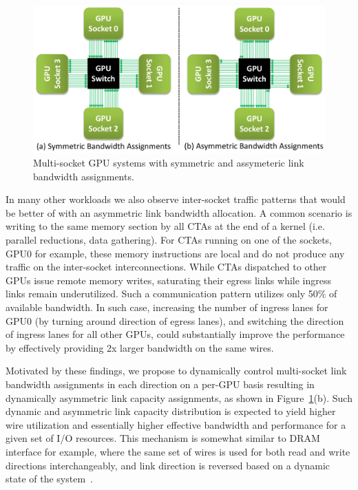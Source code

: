 \begin{figure}[t]
    \centering
    \includegraphics[width=1.0\columnwidth]{figures/tms_links.pdf}
    \caption{Multi-socket GPU systems with symmetric and assymeteric link
    bandwidth assignments.}
    \label{fig:symmetric_assymetric}
    \vspace{-.2in}
\end{figure}

In many other workloads we also observe inter-socket traffic patterns that
would be better of with an asymmetric link bandwidth allocation. A common
scenario is writing to the same memory section by all CTAs at the end of a
kernel (i.e. parallel reductions, data gathering). For CTAs running on one of the
sockets, GPU0 for example, these memory instructions are local and do not
produce any traffic on the inter-socket interconnections. While CTAs dispatched
to other GPUs issue remote memory writes, saturating their egress links while
ingress links remain underutilized. Such a communication pattern utilizes only
50\% of available bandwidth. In such case, increasing the number of ingress lanes for GPU0
(by turning around direction of egress lanes), and switching the direction of
ingress lanes for all other GPUs, could substantially improve the performance
by effectively providing 2x larger bandwidth on the same wires. 

Motivated by these findings, we propose to dynamically control multi-socket
link bandwidth assignments in each direction on a per-GPU basis resulting in
dynamically asymmetric link capacity assignments, as shown in
Figure~\ref{fig:symmetric_assymetric}(b). Such dynamic and asymmetric link
capacity distribution is expected to yield higher wire utilization and
essentially higher effective bandwidth and performance for a given set of I/O
resources. This mechanism is somewhat similar to DRAM interface for example,
where the same set of wires is used for both read and write directions
interchangeably, and link direction is reversed based on a dynamic state of the
system~\cite{jedecDDR3}. 

